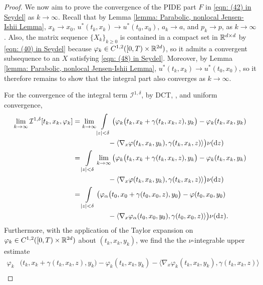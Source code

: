 \begin{proof}
    We now aim to prove the convergence of the PIDE part $F$ in \eqref{eqn: (42) in Seydel} as $k \rightarrow \infty$. Recall that by Lemma \ref{lemma: Parabolic, nonlocal Jensen-Ishii Lemma}, $x_k \rightarrow x_0$, $u^*(t_k,x_k) \rightarrow u^*(t_0,x_0)$, $a_k \rightarrow a$, and $p_k \rightarrow p$, as $k \rightarrow \infty$. Also, the matrix sequence $\{X_k\}_{k \geq 0}$ is contained in a compact set in $\mathbb{R}^{d \times d}$ by \eqref{eqn: (40) in Seydel} because $\varphi_k \in C^{1,2}([0,T) \times \mathbb{R}^{2d})$, so it admits a convergent subsequence to an $X$ satisfying \eqref{eqn: (48) in Seydel}. Moreover, by Lemma \ref{lemma: Parabolic, nonlocal Jensen-Ishii Lemma}, $u^*(t_k,x_k) \rightarrow u^*(t_0,x_0)$, so it therefore remains to show that the integral part also converges as $k \rightarrow \infty$. 

    For the convergence of the integral term $\mathcal{I}^{1,\delta}$, by DCT, , and uniform convergence, 
    \begin{align*}
        \lim_{k \rightarrow \infty} \mathcal{I}^{1,\delta}[t_k,x_k,\varphi_k] &= \lim_{k \rightarrow \infty} \int\limits \limits_{|z| < \delta} \big( \varphi_k \big( t_k,x_k+\gamma(t_k,x_k,z), y_k \big) - \varphi_k(t_k,x_k,y_k) \\
        & \qquad \qquad \quad - \langle \nabla_x \varphi(t_k,x_k,y_k), \gamma(t_k,x_k,z) \rangle \big) \nu (\mathrm{d} z) \\
        &= \int\limits_{|z|<\delta} \lim_{k \rightarrow \infty} \big( \varphi_k \big( t_k,x_k+\gamma(t_k,x_k,z), y_k \big) - \varphi_k(t_k,x_k,y_k) \\
        & \qquad \qquad \quad -\langle \nabla_x \varphi(t_k,x_k,y_k), \gamma(t_k,x_k,z) \rangle \big) \nu (\mathrm{d} z) \\
        &= \int\limits_{|z|<\delta} \big( \varphi_\alpha\big(t_0,x_0+\gamma(t_0,x_0,z),y_0\big) - \varphi(t_0,x_0,y_0) \\
        & \qquad \qquad \quad -\langle \nabla_x \varphi_\alpha(t_0,x_0,y_0), \gamma(t_0,x_0,z) \rangle \big) \nu(\mathrm{d} z).
    \end{align*}
    Furthermore, with the application of the Taylor expansion on $\varphi_k \in C^{1,2}([0,T) \times \mathbb{R}^{2d})$ about $(t_k,x_k,y_k)$, we find the the $\nu$-integrable upper estimate 
    \begin{align*}
        \varphi_k&\big(t_k,x_k+\gamma(t_k,x_k,z),y_k\big) - \varphi_k(t_k,x_k,y_k) - \langle \nabla_x \varphi_k (t_k,x_k,y_k), \gamma(t_k,x_k,z) \rangle \\

\end{align*}
\end{proof}
